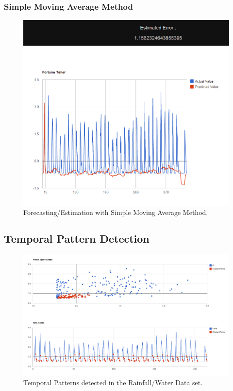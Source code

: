 \documentclass[12pt]{report}
\begin{document}
\subsubsection{Simple Moving Average Method}
\begin{figure}[h!]
  \centering
    \includegraphics[scale=0.5]{./screenshots/result_fort_SMA.png}
  \caption{Forecasting/Estimation with Simple Moving Average Method.}
\end{figure}

\subsection{Temporal Pattern Detection}

\begin{figure}[h!]

  \centering
    \includegraphics[scale=0.35]{./screenshots/result_tmp_pattern.png}
  \caption{Temporal Patterns detected in the Rainfall/Water Data set.}
\end{figure}
\end{document}
